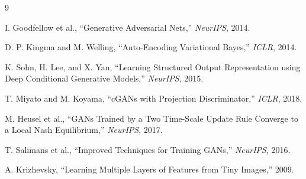 \documentclass[11pt]{article}
\begin{document}
\begin{thebibliography}{9}

I. Goodfellow et al., ``Generative Adversarial Nets,'' \textit{NeurIPS}, 2014.

D. P. Kingma and M. Welling, ``Auto-Encoding Variational Bayes,'' \textit{ICLR}, 2014.

K. Sohn, H. Lee, and X. Yan, ``Learning Structured Output Representation using Deep Conditional Generative Models,'' \textit{NeurIPS}, 2015.

T. Miyato and M. Koyama, ``cGANs with Projection Discriminator,'' \textit{ICLR}, 2018.

M. Heusel et al., ``GANs Trained by a Two Time-Scale Update Rule Converge to a Local Nash Equilibrium,'' \textit{NeurIPS}, 2017.

T. Salimans et al., ``Improved Techniques for Training GANs,'' \textit{NeurIPS}, 2016.

A. Krizhevsky, ``Learning Multiple Layers of Features from Tiny Images,'' 2009.

\end{thebibliography}
\end{document}
